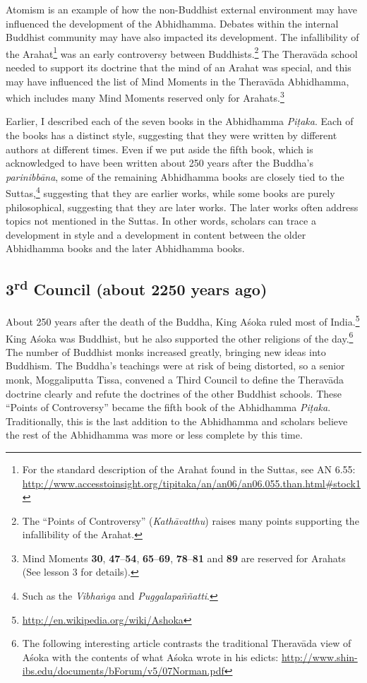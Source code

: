 Atomism is an example of how the non-Buddhist external environment may have influenced the development of the Abhidhamma. Debates within the internal Buddhist community may have also impacted its development. The infallibility of the Arahat\footnote{For the standard description of the Arahat found in the Suttas, see AN 6.55: \url{http://www.accesstoinsight.org/tipitaka/an/an06/an06.055.than.html\#stock1}} was an early controversy between Buddhists.\footnote{The “Points of Controversy” (\textit{Kathāvatthu}) raises many points supporting the infallibility of the Arahat.} The Theravāda school needed to support its doctrine that the mind of an Arahat was special, and this may have influenced the list of Mind Moments in the Theravāda Abhidhamma, which includes many Mind Moments reserved only for Arahats.\footnote{Mind Moments \textbf{30}, \textbf{47}--\textbf{54}, \textbf{65}--\textbf{69}, \textbf{78}--\textbf{81} and \textbf{89} are reserved for Arahats (See lesson 3 for details).}

Earlier, I described each of the seven books in the Abhidhamma \textit{Piṭaka}. Each of the books has a distinct style, suggesting that they were written by different authors at different times. Even if we put aside the fifth book, which is acknowledged to have been written about 250 years after the Buddha’s \textit{parinibbāna}, some of the remaining Abhidhamma books are closely tied to the Suttas,\footnote{Such as the \textit{Vibhaṅga} and \textit{Puggalapaññatti}.} suggesting that they are earlier works, while some books are purely philosophical, suggesting that they are later works. The later works often address topics not mentioned in the Suttas. In other words, scholars can trace a development in style and a development in content between the older Abhidhamma books and the later Abhidhamma books.

\pagebreak

\subsection*{3\textsuperscript{rd} Council (about 2250 years ago)}

About 250 years after the death of the Buddha, King Aśoka ruled most of India.\footnote{\url{http://en.wikipedia.org/wiki/Ashoka}} King Aśoka was Buddhist, but he also supported the other religions of the day.\footnote{The following interesting article contrasts the traditional Theravāda view of Aśoka with the contents of what Aśoka wrote in his edicts: \url{http://www.shin-ibs.edu/documents/bForum/v5/07Norman.pdf}} The number of Buddhist monks increased greatly, bringing new ideas into Buddhism. The Buddha’s teachings were at risk of being distorted, so a senior monk, Moggaliputta Tissa, convened a Third Council to define the Theravāda doctrine clearly and refute the doctrines of the other Buddhist schools. These “Points of Controversy” became the fifth book of the Abhidhamma \textit{Piṭaka}. Traditionally, this is the last addition to the Abhidhamma and scholars believe the rest of the Abhidhamma was more or less complete by this time.

